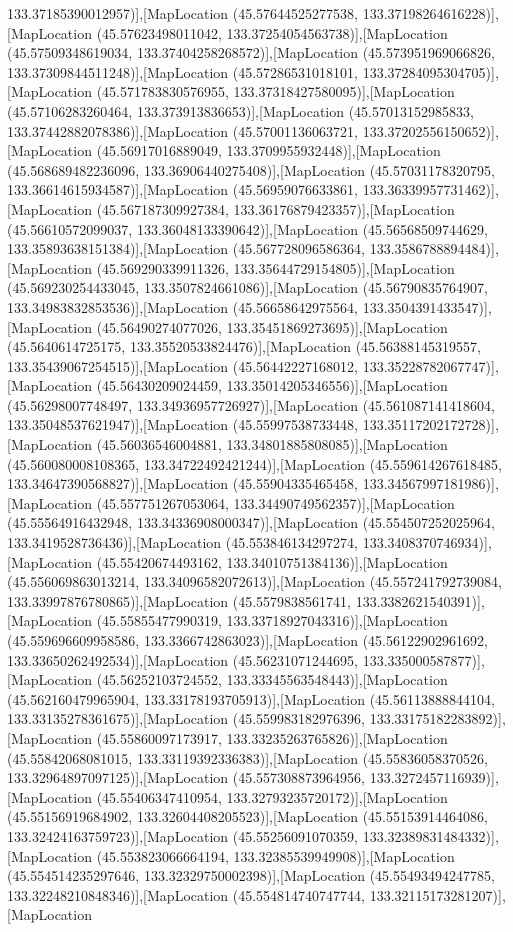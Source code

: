 133.37185390012957)],[MapLocation (45.57644525277538, 133.37198264616228)],[MapLocation (45.57623498011042, 133.37254054563738)],[MapLocation (45.57509348619034, 133.37404258268572)],[MapLocation (45.573951969066826, 133.37309844511248)],[MapLocation (45.57286531018101, 133.37284095304705)],[MapLocation (45.571783830576955, 133.37318427580095)],[MapLocation (45.57106283260464, 133.373913836653)],[MapLocation (45.57013152985833, 133.37442882078386)],[MapLocation (45.57001136063721, 133.37202556150652)],[MapLocation (45.56917016889049, 133.3709955932448)],[MapLocation (45.568689482236096, 133.36906440275408)],[MapLocation (45.57031178320795, 133.36614615934587)],[MapLocation (45.56959076633861, 133.36339957731462)],[MapLocation (45.567187309927384, 133.36176879423357)],[MapLocation (45.56610572099037, 133.36048133390642)],[MapLocation (45.56568509744629, 133.35893638151384)],[MapLocation (45.567728096586364, 133.3586788894484)],[MapLocation (45.569290339911326, 133.35644729154805)],[MapLocation (45.569230254433045, 133.3507824661086)],[MapLocation (45.56790835764907, 133.34983832853536)],[MapLocation (45.56658642975564, 133.3504391433547)],[MapLocation (45.56490274077026, 133.35451869273695)],[MapLocation (45.5640614725175, 133.35520533824476)],[MapLocation (45.56388145319557, 133.35439067254515)],[MapLocation (45.56442227168012, 133.35228782067747)],[MapLocation (45.56430209024459, 133.35014205346556)],[MapLocation (45.56298007748497, 133.34936957726927)],[MapLocation (45.561087141418604, 133.35048537621947)],[MapLocation (45.55997538733448, 133.35117202172728)],[MapLocation (45.56036546004881, 133.34801885808085)],[MapLocation (45.560080008108365, 133.34722492421244)],[MapLocation (45.559614267618485, 133.34647390568827)],[MapLocation (45.55904335465458, 133.34567997181986)],[MapLocation (45.557751267053064, 133.34490749562357)],[MapLocation (45.55564916432948, 133.34336908000347)],[MapLocation (45.554507252025964, 133.3419528736436)],[MapLocation (45.553846134297274, 133.3408370746934)],[MapLocation (45.55420674493162, 133.34010751384136)],[MapLocation (45.556069863013214, 133.34096582072613)],[MapLocation (45.557241792739084, 133.33997876780865)],[MapLocation (45.5579838561741, 133.3382621540391)],[MapLocation (45.55855477990319, 133.33718927043316)],[MapLocation (45.559696609958586, 133.3366742863023)],[MapLocation (45.56122902961692, 133.33650262492534)],[MapLocation (45.56231071244695, 133.335000587877)],[MapLocation (45.56252103724552, 133.33345563548443)],[MapLocation (45.562160479965904, 133.33178193705913)],[MapLocation (45.56113888844104, 133.33135278361675)],[MapLocation (45.559983182976396, 133.33175182283892)],[MapLocation (45.55860097173917, 133.33235263765826)],[MapLocation (45.55842068081015, 133.33119392336383)],[MapLocation (45.55836058370526, 133.32964897097125)],[MapLocation (45.557308873964956, 133.3272457116939)],[MapLocation (45.55406347410954, 133.32793235720172)],[MapLocation (45.55156919684902, 133.32604408205523)],[MapLocation (45.55153914464086, 133.32424163759723)],[MapLocation (45.55256091070359, 133.32389831484332)],[MapLocation (45.553823066664194, 133.32385539949908)],[MapLocation (45.554514235297646, 133.32329750002398)],[MapLocation (45.55493494247785, 133.32248210848346)],[MapLocation (45.554814740747744, 133.32115173281207)],[MapLocation 
